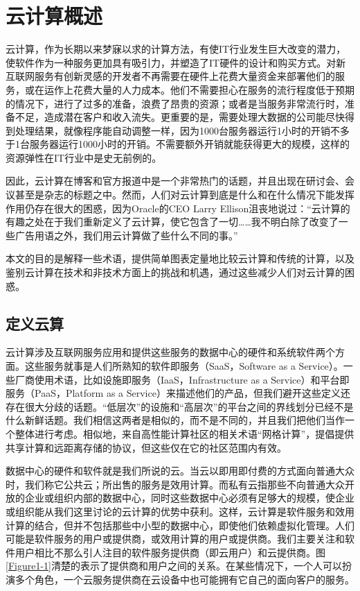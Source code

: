 \chapter{云计算概述}

云计算，作为长期以来梦寐以求的计算方法，有使IT行业发生巨大改变的潜力，使软件作为一种服务更加具有吸引力，并塑造了IT硬件的设计和购买方式。对新互联网服务有创新灵感的开发者不再需要在硬件上花费大量资金来部署他们的服务，或在运作上花费大量的人力成本。他们不需要担心在服务的流行程度低于预期的情况下，进行了过多的准备，浪费了昂贵的资源；或者是当服务非常流行时，准备不足，造成潜在客户和收入流失。更重要的是，需要处理大数据的公司能尽快得到处理结果，就像程序能自动调整一样，因为1000台服务器运行1小时的开销不多于1台服务器运行1000小时的开销。不需要额外开销就能获得更大的规模，这样的资源弹性在IT行业中是史无前例的。

因此，云计算在博客和官方报道中是一个非常热门的话题，并且出现在研讨会、会议甚至是杂志的标题之中。然而，人们对云计算到底是什么和在什么情况下能发挥作用仍存在很大的困惑，因为Oracle的CEO Larry Ellison沮丧地说过：“云计算的有趣之处在于我们重新定义了云计算，使它包含了一切……我不明白除了改变了一些广告用语之外，我们用云计算做了些什么不同的事。”

本文的目的是解释一些术语，提供简单图表定量地比较云计算和传统的计算，以及鉴别云计算在技术和非技术方面上的挑战和机遇，通过这些减少人们对云计算的困惑。

\section{定义云算}

云计算涉及互联网服务应用和提供这些服务的数据中心的硬件和系统软件两个方面。这些服务就事是人们所熟知的软件即服务（SaaS，Software as a Service）。一些厂商使用术语，比如设施即服务（IaaS，Infrastructure as a Service）和平台即服务（PaaS，Platform as a Service）来描述他们的产品，但我们避开这些定义还存在很大分歧的话题。“低层次”的设施和“高层次”的平台之间的界线划分已经不是什么新鲜话题。我们相信这两者是相似的，而不是不同的，并且我们把他们当作一个整体进行考虑。相似地，来自高性能计算社区的相关术语“网格计算”，提倡提供共享计算和远距离存储的协议，但这些仅在它的社区范围内有效。

数据中心的硬件和软件就是我们所说的云。当云以即用即付费的方式面向普通大众时，我们称它公共云；所出售的服务是效用计算。而私有云指那些不向普通大众开放的企业或组织内部的数据中心，同时这些数据中心必须有足够大的规模，使企业或组织能从我们这里讨论的云计算的优势中获利。这样，云计算是软件服务和效用计算的结合，但并不包括那些中小型的数据中心，即使他们依赖虚拟化管理。人们可能是软件服务的用户或提供商，或效用计算的用户或提供商。我们主要关注和软件用户相比不那么引人注目的软件服务提供商（即云用户）和云提供商。图\ref{Figure1-1}清楚的表示了提供商和用户之间的关系。在某些情况下，一个人可以扮演多个角色，一个云服务提供商在云设备中也可能拥有它自己的面向客户的服务。


